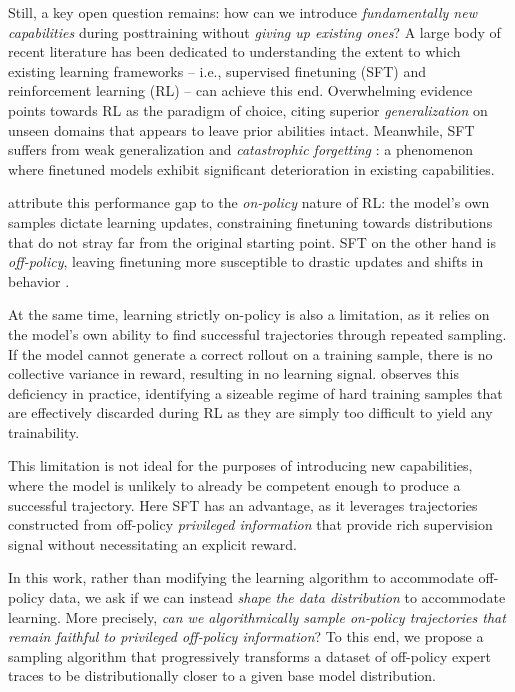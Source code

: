 \documentclass{article}
\begin{document}
Still, a key open question remains: how can we introduce \textit{fundamentally new capabilities} during posttraining without \textit{giving up existing ones}? A large body of recent literature has been dedicated to understanding the extent to which existing learning frameworks -- i.e., supervised finetuning (SFT) and reinforcement learning (RL) -- can achieve this end. Overwhelming evidence \citep{chen2025retaining, chu2025sftmemorizesrlgeneralizes, shenfeld2025rl} points towards RL as the paradigm of choice, citing superior \textit{generalization} on unseen domains that appears to leave prior abilities intact. Meanwhile, SFT suffers from weak generalization and \textit{catastrophic forgetting} \citep{kirkpatrick2017overcoming, luo2023empirical}: a phenomenon where finetuned models exhibit significant deterioration in existing capabilities.


\cite{chen2025retaining, shenfeld2025rl} attribute this performance gap to the \textit{on-policy} nature of RL: the model's own samples dictate learning updates, constraining finetuning towards distributions that do not stray far from the original starting point. SFT on the other hand is \textit{off-policy}, leaving finetuning more susceptible to drastic updates and shifts in behavior \citep{xiong2025minimalist}.


At the same time, learning strictly on-policy is also a limitation, as it relies on the model's own ability to find successful trajectories through repeated sampling. If the model cannot generate a correct rollout on a training sample, there is no collective variance in reward, resulting in no learning signal. \cite{qu2026pope} observes this deficiency in practice, identifying a sizeable regime of hard training samples that are effectively discarded during RL as they are simply too difficult to yield any trainability.

This limitation is not ideal for the purposes of introducing new capabilities, where the model is unlikely to already be competent enough to produce a successful trajectory.  Here SFT has an advantage, as it leverages trajectories constructed from off-policy \textit{privileged information} that provide rich supervision signal without necessitating an explicit reward. 


In this work, rather than modifying the learning algorithm to accommodate off-policy data, we ask if we can instead \textit{shape the data distribution} to accommodate  learning. More precisely, \textit{can we algorithmically sample on-policy trajectories that remain faithful to privileged off-policy information}? To this end, we propose a sampling algorithm that progressively transforms a dataset of off-policy expert traces to be distributionally closer to a given base model distribution.
\end{document}
